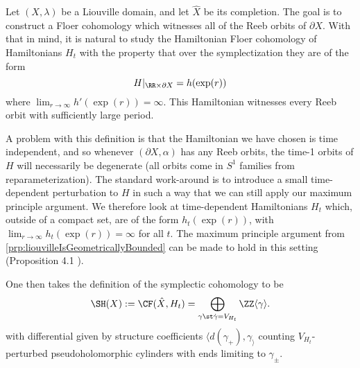 

   \label{con:symplecticCohomologyQuadratic}
   Let $(X, \lambda)$ be a Liouville domain, and let $\hat X$ be its completion. The goal is to construct a Floer cohomology which witnesses all of the Reeb orbits of $\partial X$. With that in mind, it is natural to study the Hamiltonian Floer cohomology of Hamiltonians $H_t$ with the property that over the symplectization they are of the form 
   \[H|_{\RR\times \partial X}=h(\exp(r))\]
   where $\lim_{r\to\infty} h'(\exp(r))=\infty$. This Hamiltonian witnesses every Reeb orbit with sufficiently large period. 
   
   
   A problem with this definition is that the Hamiltonian we have chosen is time independent, and so whenever $(\partial X, \alpha)$ has any Reeb orbits, the time-1 orbits of $H$ will necessarily be degenerate (all orbits come in $S^1$ families from reparameterization). The standard work-around is to introduce a small time-dependent perturbation to $H$ in such a way that we can still apply our maximum principle argument. We therefore look at time-dependent Hamiltonians $H_t$ which, outside of a compact set, are of the form $h_t(\exp(r))$, with $\lim_{r\to\infty} h_t(\exp(r))=\infty$ for all $t$. The maximum principle argument from \cref{prp:liouvilleIsGeometricallyBounded} can be made to hold in this setting (Proposition 4.1 \cite{wendlbeginner}).

   One then takes the definition of the symplectic cohomology to be 
   \[\SH(X):=\CF(\hat X, H_t)=\bigoplus_{\gamma\st \dot \gamma= V_{H_t}} \ZZ\langle \gamma\rangle.\]
   with differential given by structure coefficients $\langle d(\gamma_+), \gamma_\rangle$ counting $V_{H_t}$-perturbed pseudoholomorphic cylinders with ends limiting to $\gamma_\pm$.
